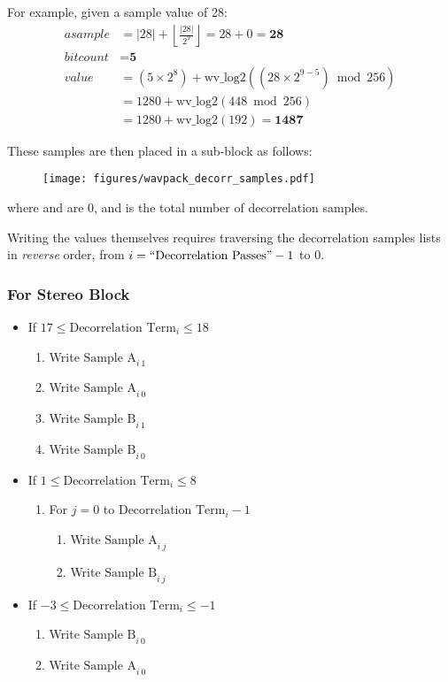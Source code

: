 \par
\noindent
For example, given a sample value of 28:
\begin{align*}
asample &= |28| + \left\lfloor\frac{|28|}{2^9}\right\rfloor = 28 + 0 = \textbf{28} \\
bitcount &= \textbf{5} \\
value &= (5 \times 2^8) + \text{wv\_log2}((28 \times 2^{9 - 5}) \bmod{256}) \\
&= 1280 + \text{wv\_log2}(448 \bmod{256}) \\
&= 1280 + \text{wv\_log2}(192) = \textbf{1487}
\end{align*}

\clearpage

These samples are then placed in a sub-block as follows:
\begin{figure}[h]
\texttt{[image: figures/wavpack\_decorr\_samples.pdf]}
\end{figure}
\par
\noindent
where  and  are 0,
and  is the total number of decorrelation samples.

Writing the values themselves requires traversing the
decorrelation samples lists in \textit{reverse} order,
from $i = \text{``{Decorrelation Passes}''} - 1$ to 0.

\subsubsection{For Stereo Block}
\begin{itemize}
\item If $17 \leq \text{Decorrelation Term}_i \leq 18$
\begin{enumerate}
\item Write $\text{Sample A}_{i~1}$
\item Write $\text{Sample A}_{i~0}$
\item Write $\text{Sample B}_{i~1}$
\item Write $\text{Sample B}_{i~0}$
\end{enumerate}
\item If $1 \leq \text{Decorrelation Term}_i \leq 8$
\begin{enumerate}
\item For $j = 0$ to $\text{Decorrelation Term}_i - 1$
\begin{enumerate}
\item Write $\text{Sample A}_{i~j}$
\item Write $\text{Sample B}_{i~j}$
\end{enumerate}
\end{enumerate}
\item If $-3 \leq \text{Decorrelation Term}_i \leq -1$
\begin{enumerate}
\item Write $\text{Sample B}_{i~0}$
\item Write $\text{Sample A}_{i~0}$
\end{enumerate}
\end{itemize}

